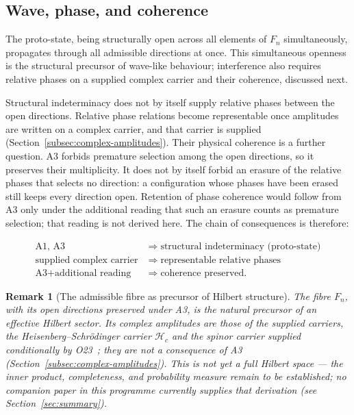 \documentclass[11pt,a4paper]{article}
\newtheorem{remark}[theorem]{Remark}
\begin{document}
  \subsection{Wave, phase, and coherence}

    The proto-state, being structurally open across all elements of $F_n$
    simultaneously, propagates through all admissible directions at once.
    This simultaneous openness is the structural precursor of wave-like behaviour; interference also requires
    relative phases on a supplied complex carrier and their coherence, discussed next.

    Structural indeterminacy does not by itself supply relative phases between the open directions.
    Relative phase relations become representable once amplitudes are written on a complex carrier, and that
    carrier is supplied (Section~\ref{subsec:complex-amplitudes}).
    Their physical coherence is a further question.
    A3 forbids premature selection among the open directions, so it preserves their multiplicity.
    It does not by itself forbid an erasure of the relative phases that selects no direction: a configuration
    whose phases have been erased still keeps every direction open.
    Retention of phase coherence would follow from A3 only under the additional reading that such an erasure
    counts as premature selection; that reading is not derived here.
    The chain of consequences is therefore:

    \begin{equation}
      \begin{aligned}
        \text{A1, A3}
        &\;\Longrightarrow\; \text{structural indeterminacy (proto-state)} \\
        \text{supplied complex carrier}
        &\;\Longrightarrow\; \text{representable relative phases} \\
        \text{A3} + \text{additional reading}
        &\;\Longrightarrow\; \text{coherence preserved.}
      \end{aligned}
    \end{equation}

    \begin{remark}[The admissible fibre as precursor of Hilbert structure]
  The fibre $F_n$, with its open directions preserved under A3, is the
  natural precursor of an effective Hilbert sector.
  Its complex amplitudes are those of the supplied carriers, the Heisenberg--Schr\"odinger carrier
  $\mathcal{H}_c$ and the spinor carrier supplied conditionally by O23~\cite{Beau2026a27}; they are not a
  consequence of A3
  (Section~\ref{subsec:complex-amplitudes}).
  This is not yet a full Hilbert space — the inner product, completeness,
  and probability measure remain to be established; no companion paper in
  this programme currently supplies that derivation (see
  Section~\ref{sec:summary}).
    \end{remark}
\end{document}
